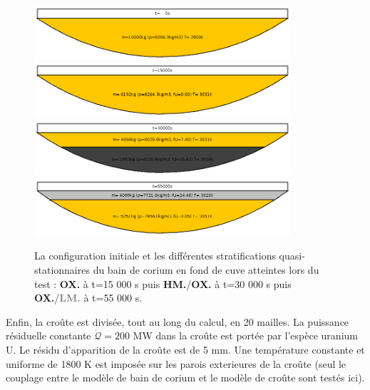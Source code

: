 \begin{figure}
\centering
\includegraphics[width=0.85\textwidth, keepaspectratio=true]{Figures/coriumPool_t=00000.png}\\
\includegraphics[width=0.85\textwidth, keepaspectratio=true]{Figures/coriumPool_t=15000.png}\\
\includegraphics[width=0.85\textwidth, keepaspectratio=true]{Figures/coriumPool_t=30000.png}\\
\includegraphics[width=0.85\textwidth, keepaspectratio=true]{Figures/coriumPool_t=55000.png}
\caption{La configuration initiale et les différentes stratifications quasi-stationnaires du bain de corium en fond de cuve atteintes lors du test : \textcolor{yellow!75!black}{\textbf{OX.}} à t=15 000 s puis \textbf{HM.}/\textcolor{yellow!75!black}{\textbf{OX.}} à t=30 000 s puis \textcolor{yellow!75!black}{\textbf{OX.}}/\textcolor{gray}{\textbf{LM.}} à t=55 000 s.}
\label{fig:stratifications_bains}
\end{figure}

Enfin, la croûte est divisée, tout au long du calcul, en 20 mailles. La puissance résiduelle constante $\dot{\mathcal{Q}} = 200$ MW dans la croûte est portée par l'espèce uranium U. Le résidu d'apparition de la croûte est de 5 mm. Une température constante et uniforme de 1800 K est imposée sur les parois exterieures de la croûte (seul le couplage entre le modèle de bain de corium et le modèle de croûte sont testés ici).

